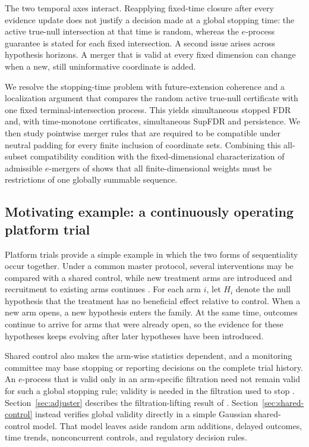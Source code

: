\documentclass[11pt]{article}
\numberwithin{equation}{section}
\theoremstyle{plain}
\theoremstyle{definition}
\begin{document}
The two temporal axes interact. Reapplying fixed-time closure after every evidence update does not justify a decision made at a global stopping time: the active true-null intersection at that time is random, whereas the $e$-process guarantee is stated for each fixed intersection. A second issue arises across hypothesis horizons. A merger that is valid at every fixed dimension can change when a new, still uninformative coordinate is added.

We resolve the stopping-time problem with future-extension coherence and a localization argument that compares the random active true-null certificate with one fixed terminal-intersection process. This yields simultaneous stopped FDR and, with time-monotone certificates, simultaneous SupFDR and persistence. We then study pointwise merger rules that are required to be compatible
under neutral padding for every finite inclusion of coordinate sets.
Combining this all-subset compatibility condition with the
fixed-dimensional characterization of admissible $e$-mergers of
\citet{Wang2025Merging} shows that all finite-dimensional weights must
be restrictions of one globally summable sequence.

\subsection{Motivating example: a continuously operating platform trial}\label{sec:platform-motivation}

Platform trials provide a simple example in which the two forms of sequentiality occur together. Under a common master protocol, several interventions may be compared with a shared control, while new treatment arms are introduced and recruitment to existing arms continues \citep{LeeEtAl2021Platform,RobertsonWasonRamdas2023}. For each arm $i$, let $H_i$ denote the null hypothesis that the treatment has no beneficial effect relative to control. When a new arm opens, a new hypothesis enters the family. At the same time, outcomes continue to arrive for arms that were already open, so the evidence for these hypotheses keeps evolving after later hypotheses have been introduced.

Shared control also makes the arm-wise statistics dependent, and a monitoring committee may base stopping or reporting decisions on the complete trial history. An $e$-process that is valid only in an arm-specific filtration need not remain valid for such a global stopping rule; validity is needed in the filtration used to stop \citep{WangDandapanthulaRamdas2025,ChoeRamdas2026}. Section~\ref{sec:adjuster} describes the filtration-lifting result of \citet{ChoeRamdas2026}. Section~\ref{sec:shared-control} instead verifies global validity directly in a simple Gaussian shared-control model. That model leaves aside random arm additions, delayed outcomes, time trends, nonconcurrent controls, and regulatory decision rules.
\end{document}
